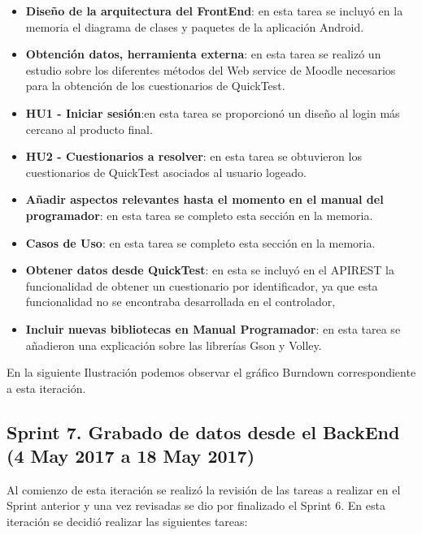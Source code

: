 \begin{itemize}

	\item \textbf{Diseño de la arquitectura del FrontEnd}: en esta tarea se incluyó en la memoria el diagrama de clases y paquetes de la aplicación Android.
	\item \textbf{Obtención datos, herramienta externa}: en esta tarea se realizó un estudio sobre los diferentes métodos del Web service de Moodle necesarios para la obtención de los cuestionarios de QuickTest.
	\item \textbf{HU1 - Iniciar sesión}:en esta tarea se proporcionó un diseño al login más cercano al producto final.
	\item \textbf{HU2 - Cuestionarios a resolver}: en esta tarea se obtuvieron los cuestionarios de QuickTest asociados al usuario logeado.
	\item \textbf{Añadir aspectos relevantes hasta el momento en el manual del programador}: en esta tarea se completo esta sección en la memoria.
	\item \textbf{Casos de Uso}: en esta tarea se completo esta sección en la memoria.
	\item \textbf{Obtener datos desde QuickTest}: en esta se incluyó en el APIREST la funcionalidad de obtener un cuestionario por identificador, ya que esta funcionalidad no se encontraba desarrollada en el controlador,
	\item \textbf{Incluir nuevas bibliotecas en Manual Programador}: en esta tarea se añadieron una explicación sobre las librerías Gson y Volley.


\end{itemize}

En la siguiente Ilustración podemos observar el gráfico Burndown correspondiente a esta iteración.

\subsection{Sprint 7. Grabado de datos desde el BackEnd (4 May 2017 a 18 May 2017)}

Al comienzo de esta iteración se realizó la revisión de las tareas a realizar en el Sprint anterior y una vez revisadas se dio por finalizado el Sprint 6. 
En esta iteración se decidió realizar las siguientes tareas:

